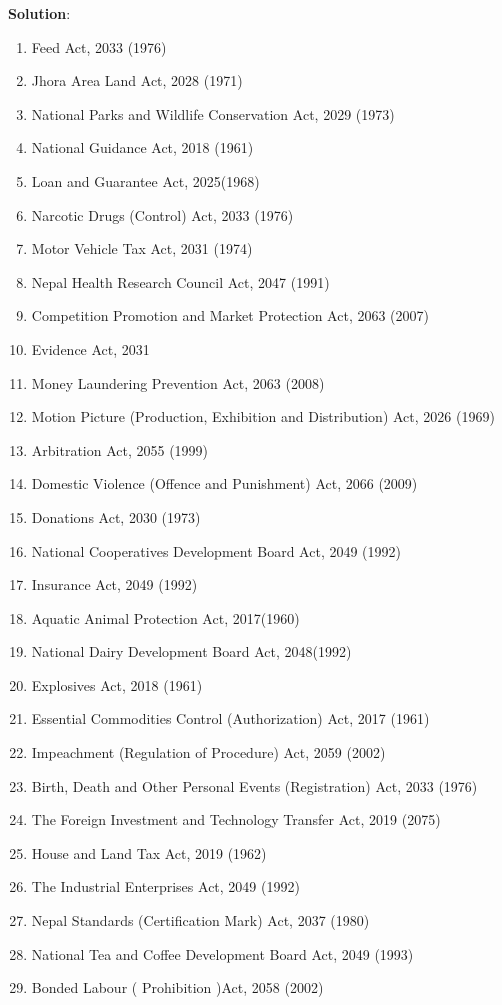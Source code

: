 \documentclass[
  openany]{book}
\newenvironment{solution}{ {\bfseries Solution}:}{}
\begin{document}
\begin{questions}
\begin{solution}
\begin{enumerate}
\item Feed Act, 2033 (1976)
\item Jhora Area Land Act, 2028 (1971)
\item National Parks and Wildlife Conservation Act, 2029 (1973)
\item National Guidance Act, 2018 (1961)
\item Loan and Guarantee Act, 2025(1968)
\item Narcotic Drugs (Control) Act, 2033 (1976)
\item Motor Vehicle Tax Act, 2031 (1974)
\item Nepal Health Research Council Act, 2047 (1991)
\item Competition Promotion and Market Protection Act, 2063 (2007)
\item Evidence Act, 2031
\item Money Laundering Prevention Act, 2063 (2008)
\item Motion Picture (Production, Exhibition and Distribution) Act, 2026 (1969)
\item Arbitration Act, 2055 (1999)
\item Domestic Violence (Offence and Punishment) Act, 2066 (2009)
\item Donations Act, 2030 (1973)
\item National Cooperatives Development Board Act, 2049 (1992)
\item Insurance Act, 2049 (1992)
\item Aquatic Animal Protection Act, 2017(1960)
\item National Dairy Development Board Act, 2048(1992)
\item Explosives Act, 2018 (1961)
\item Essential Commodities Control (Authorization) Act, 2017 (1961)
\item Impeachment (Regulation of Procedure) Act, 2059 (2002)
\item Birth, Death and Other Personal Events (Registration) Act, 2033 (1976)
\item The Foreign Investment and Technology Transfer Act, 2019 (2075)
\item House and Land Tax Act, 2019 (1962)
\item The Industrial Enterprises Act, 2049 (1992)
\item Nepal Standards (Certification Mark) Act, 2037 (1980)
\item National Tea and Coffee Development Board Act, 2049 (1993)
\item Bonded Labour ( Prohibition )Act, 2058 (2002)

\end{enumerate}
\end{solution}
\end{questions}
\end{document}
